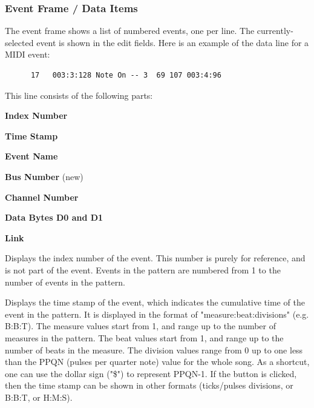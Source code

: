 \subsubsection{Event Frame / Data Items}
\label{subsec:event_frame_data}

   The event frame shows a list of numbered events, one per line.
   The currently-selected event is shown in the edit fields.
   Here is an example of the data line for a MIDI event:

   \begin{verbatim}
      17   003:3:128 Note On -- 3  69 107 003:4:96
   \end{verbatim}

   This line consists of the following parts:

   \begin{enumber}
      \item \textbf{Index Number}
      \item \textbf{Time Stamp}
      \item \textbf{Event Name}
      \item \textbf{Bus Number} (new)
      \item \textbf{Channel Number}
      \item \textbf{Data Bytes D0 and D1}
      \item \textbf{Link}
   \end{enumber}

   \setcounter{ItemCounter}{0}      %

   Displays the index number of the event.
   This number is purely for reference, and is not part
   of the event.  Events in the pattern are numbered from 1 to the number of
   events in the pattern.

   Displays the time stamp of the event,
   which indicates the cumulative time of the event in the pattern.
   It is displayed in the format of "measure:beat:divisions" (e.g. B:B:T).
   The measure values start from 1, and range up to the number of measures in
   the pattern.
   The beat values start from 1, and range up to the number of beats in the
   measure.
   The division values range from 0 up to one less than the
   PPQN (pulses per quarter note) value for the whole song.
   As a shortcut, one can use the dollar sign ("\$") to represent
   PPQN-1.
   If the \textbf{} button is clicked, then the time stamp can be shown
   in other formats (ticks/pulses divisions, or B:B:T, or H:M:S).

